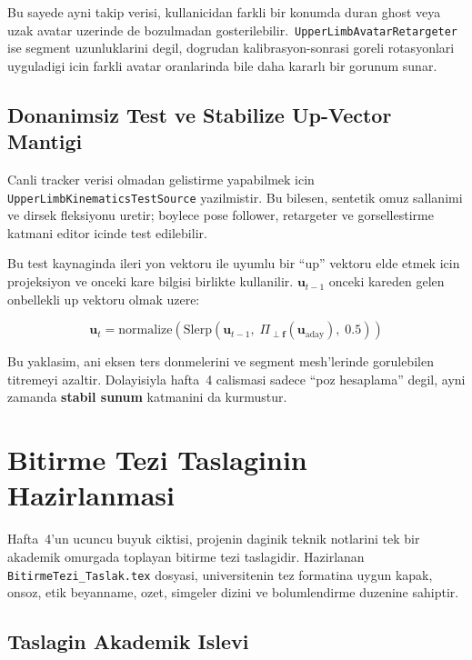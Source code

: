 \documentclass[11pt,a4paper]{article}
\begin{document}
Bu sayede ayni takip verisi, kullanicidan farkli bir konumda duran ghost veya
uzak avatar uzerinde de bozulmadan gosterilebilir.\
\texttt{UpperLimbAvatarRetargeter} ise segment uzunluklarini degil, dogrudan
kalibrasyon-sonrasi goreli rotasyonlari uyguladigi icin farkli avatar oranlarinda
bile daha kararlı bir gorunum sunar.

\subsection{Donanimsiz Test ve Stabilize Up-Vector Mantigi}

Canli tracker verisi olmadan gelistirme yapabilmek icin
\texttt{UpperLimbKinematicsTestSource} yazilmistir. Bu bilesen,
sentetik omuz sallanimi ve dirsek fleksiyonu uretir; boylece pose follower,
retargeter ve gorsellestirme katmani editor icinde test edilebilir.

Bu test kaynaginda ileri yon vektoru ile uyumlu bir ``up'' vektoru elde etmek
icin projeksiyon ve onceki kare bilgisi birlikte kullanilir. $\mathbf{u}_{t-1}$
onceki kareden gelen onbellekli up vektoru olmak uzere:

\begin{equation}
    \mathbf{u}_t = \mathrm{normalize}\left(\mathrm{Slerp}(\mathbf{u}_{t-1},\;\Pi_{\perp \mathbf{f}}(\mathbf{u}_{\text{aday}}),\;0.5)\right)
    \label{eq:stable_up}
\end{equation}

Bu yaklasim, ani eksen ters donmelerini ve segment mesh'lerinde gorulebilen
titremeyi azaltir. Dolayisiyla hafta~4 calismasi sadece ``poz hesaplama''
degil, ayni zamanda \textbf{stabil sunum} katmanini da kurmustur.

\section{Bitirme Tezi Taslaginin Hazirlanmasi}
\label{sec:thesis}

Hafta~4'un ucuncu buyuk ciktisi, projenin daginik teknik notlarini tek bir
akademik omurgada toplayan bitirme tezi taslagidir. Hazirlanan
\texttt{BitirmeTezi\_Taslak.tex} dosyasi, universitenin tez formatina uygun
kapak, onsoz, etik beyanname, ozet, simgeler dizini ve bolumlendirme duzenine
sahiptir.

\subsection{Taslagin Akademik Islevi}
\end{document}
